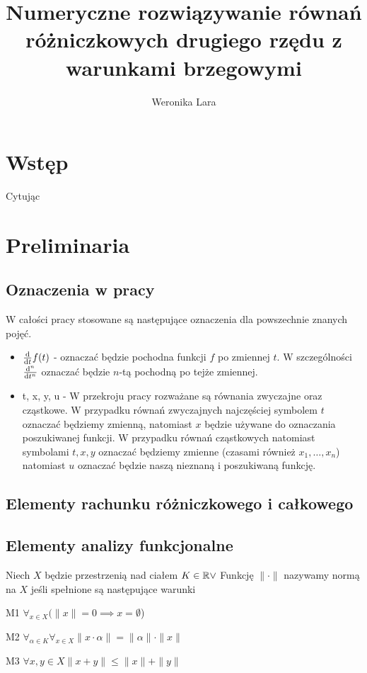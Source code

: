 \documentclass[12pt,a4paper]{report}
\author{Weronika Lara}
\title{Numeryczne rozwiązywanie równań różniczkowych drugiego rzędu z warunkami brzegowymi}
\begin{document}
\maketitle

\chapter{Wstęp}

Cytując \citep[Rozdział 3, sekcja 2]{palczewski2004rownania}

\chapter{Preliminaria}

\section{Oznaczenia w pracy}

W całości pracy stosowane są następujące oznaczenia dla powszechnie znanych pojęć.
\begin{itemize}
\item $\ddx{t} f(t)$ - oznaczać będzie pochodna funkcji $f$ po zmiennej $t$. W szczególności $\ddx[^n]{t^n}$ oznaczać będzie $n$-tą pochodną po tejże zmiennej.
\item t, x, y, u - W przekroju pracy rozważane są równania zwyczajne oraz cząstkowe. W przypadku równań zwyczajnych najczęściej symbolem $t$ oznaczać będziemy zmienną, natomiast $x$ będzie używane do oznaczania poszukiwanej funkcji. W przypadku równań cząstkowych natomiast symbolami $t,x,y$ oznaczać będziemy zmienne (czasami również $x_1,\ldots,x_n$) natomiast $u$ oznaczać będzie naszą nieznaną i poszukiwaną funkcję.
\end{itemize}

\section{Elementy rachunku różniczkowego i całkowego}


\section{Elementy analizy funkcjonalne}



\begin{definition}
Niech $X$ będzie przestrzenią nad ciałem $K \in \setR \lor  $
\newline Funkcję $\parallel\cdot\parallel$ nazywamy normą na $X$ jeśli spełnione są następujące warunki 
\item[M1] $\forall_{x\in X} (\parallel x \parallel = 0 \implies x =\emptyset$)
\item[M2] $\forall_{\alpha \in K}  \forall_{x \in X}  \parallel x \cdot\alpha\parallel = \parallel\alpha\parallel\cdot\parallel x \parallel $
\item[M3] $\forall{x,y\in X} \parallel x+y \parallel \leq \parallel x \parallel + \parallel y \parallel$
\end{definition}
\end{document}

